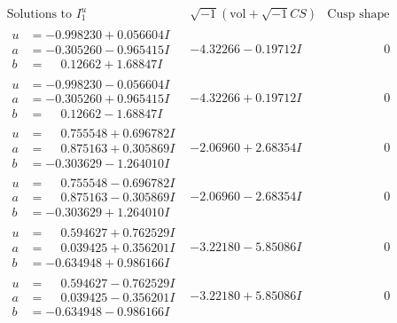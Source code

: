 \documentclass[1p]{elsarticle_modified}
\theoremstyle{definition}
\newcommand{\I}{\sqrt{-1}}
\begin{document}
$$\begin{array}{c|c|c}  
\text{Solutions to }I^u_{1}& \I (\text{vol} + \sqrt{-1}CS) & \text{Cusp shape}\\
 \hline 
\begin{aligned}
u &= -0.998230 + 0.056604 I \\
a &= -0.305260 - 0.965415 I \\
b &= \phantom{-}0.12662 + 1.68847 I\end{aligned}
 & -4.32266 - 0.19712 I & \phantom{-0.000000 } 0 \\ \hline\begin{aligned}
u &= -0.998230 - 0.056604 I \\
a &= -0.305260 + 0.965415 I \\
b &= \phantom{-}0.12662 - 1.68847 I\end{aligned}
 & -4.32266 + 0.19712 I & \phantom{-0.000000 } 0 \\ \hline\begin{aligned}
u &= \phantom{-}0.755548 + 0.696782 I \\
a &= \phantom{-}0.875163 + 0.305869 I \\
b &= -0.303629 - 1.264010 I\end{aligned}
 & -2.06960 + 2.68354 I & \phantom{-0.000000 } 0 \\ \hline\begin{aligned}
u &= \phantom{-}0.755548 - 0.696782 I \\
a &= \phantom{-}0.875163 - 0.305869 I \\
b &= -0.303629 + 1.264010 I\end{aligned}
 & -2.06960 - 2.68354 I & \phantom{-0.000000 } 0 \\ \hline\begin{aligned}
u &= \phantom{-}0.594627 + 0.762529 I \\
a &= \phantom{-}0.039425 + 0.356201 I \\
b &= -0.634948 + 0.986166 I\end{aligned}
 & -3.22180 - 5.85086 I & \phantom{-0.000000 } 0 \\ \hline\begin{aligned}
u &= \phantom{-}0.594627 - 0.762529 I \\
a &= \phantom{-}0.039425 - 0.356201 I \\
b &= -0.634948 - 0.986166 I\end{aligned}
 & -3.22180 + 5.85086 I & \phantom{-0.000000 } 0 \\ \hline\begin{aligned}

\end{aligned}
\end{array}$$
\end{document}
